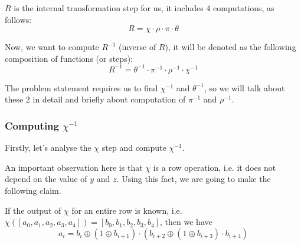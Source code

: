 \documentclass[10pt,twoside]{article}
\begin{document}
$R$ is the internal transformation step for us, it includes $4$ computations, as follows:
$$R=\chi\cdot\rho\cdot\pi\cdot\theta$$

Now, we want to compute $R^{-1}$ (inverse of $R$), it will be denoted as the following composition of functions (or steps):
$$R^{-1} = \theta^{-1}\cdot\pi^{-1}\cdot\rho^{-1}\cdot\chi^{-1}$$

The problem statement requires us to find $\chi^{-1}$ and $\theta^{-1}$, so we will talk about these $2$ in detail and briefly about computation of $\pi^{-1}$ and $\rho^{-1}$.

\subsubsection{Computing $\chi^{-1}$}

Firstly, let's analyse the $\chi$ step and compute $\chi^{-1}$.

An important observation here is that $\chi$ is a row operation, i.e. it does not depend on the value of $y$ and $z$. Using this fact, we are going to make the following claim. \newline

\begin{claim} \label{chi-inv}
  If the output of $\chi$ for an entire row is known, i.e. $\chi([a_0,a_1,a_2,a_3,a_4]) = [b_0,b_1,b_2,b_3,b_4]$, then we have
  $$a_i = b_i \oplus (1 \oplus b_{i+1})\cdot(b_{i+2} \oplus (1 \oplus b_{i+3}) \cdot b_{i+4})$$
\end{claim}
\end{document}
